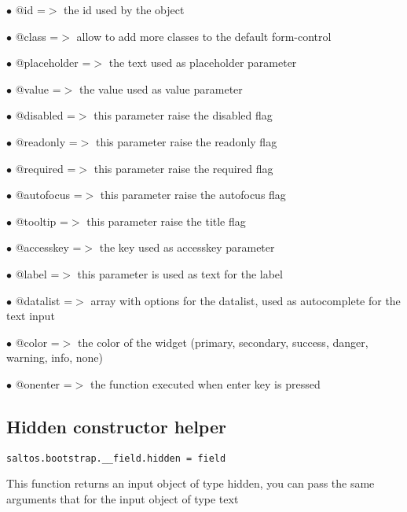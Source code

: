 \documentclass[a4paper]{book}
\begin{document}
\begin{compactitem}
\item[\color{myblue}$\bullet$] @id          =$>$ the id used by the object
\item[\color{myblue}$\bullet$] @class       =$>$ allow to add more classes to the default form-control
\item[\color{myblue}$\bullet$] @placeholder =$>$ the text used as placeholder parameter
\item[\color{myblue}$\bullet$] @value       =$>$ the value used as value parameter
\item[\color{myblue}$\bullet$] @disabled    =$>$ this parameter raise the disabled flag
\item[\color{myblue}$\bullet$] @readonly    =$>$ this parameter raise the readonly flag
\item[\color{myblue}$\bullet$] @required    =$>$ this parameter raise the required flag
\item[\color{myblue}$\bullet$] @autofocus   =$>$ this parameter raise the autofocus flag
\item[\color{myblue}$\bullet$] @tooltip     =$>$ this parameter raise the title flag
\item[\color{myblue}$\bullet$] @accesskey   =$>$ the key used as accesskey parameter
\item[\color{myblue}$\bullet$] @label       =$>$ this parameter is used as text for the label
\item[\color{myblue}$\bullet$] @datalist    =$>$ array with options for the datalist, used as autocomplete for the text input
\item[\color{myblue}$\bullet$] @color       =$>$ the color of the widget (primary, secondary, success, danger, warning, info, none)
\item[\color{myblue}$\bullet$] @onenter     =$>$ the function executed when enter key is pressed
\end{compactitem}

\hypertarget{toc461}{}
\subsection{Hidden constructor helper}

\begin{lstlisting}
saltos.bootstrap.__field.hidden = field
\end{lstlisting}

This function returns an input object of type hidden, you can pass the same arguments
that for the input object of type text
\end{document}
